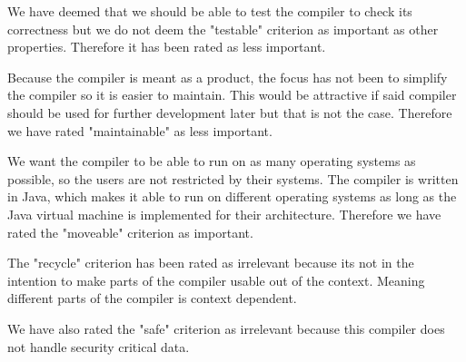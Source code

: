 We have deemed that we should be able to test the compiler to check its correctness but we do not deem the "testable" criterion as important as other properties. Therefore it has been rated as less important.

Because the compiler is meant as a product, the focus has not been to simplify the compiler so it is easier to maintain. This would be attractive if said compiler should be used for further development later but that is not the case. Therefore we have rated "maintainable" as less important.

We want the compiler to be able to run on as many operating systems as possible, so the users are not restricted by their systems. The compiler is written in Java, which makes it able to run on different operating systems as long as the Java virtual machine is implemented for their architecture. Therefore we have rated the "moveable" criterion as important.

The "recycle" criterion has been rated as irrelevant because its not in the intention to make parts of the compiler usable out of the context. Meaning different parts of the compiler is context dependent.

We have also rated the "safe" criterion as irrelevant because this compiler does not handle security critical data.